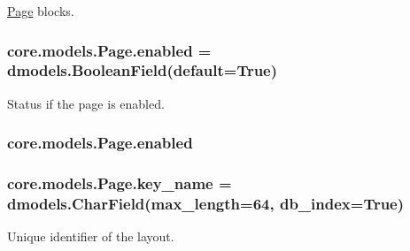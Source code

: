 \hyperlink{classcore_1_1models_1_1Page}{Page} blocks. 

\hypertarget{classcore_1_1models_1_1Page_acab3eb077ef1d77f01a48bff74c956df}{
\subsubsection[{enabled}]{\setlength{\rightskip}{0pt plus 5cm}core.\-models.\-Page.\-enabled = dmodels.\-Boolean\-Field(default=True)\hspace{0.3cm}{\ttfamily [static]}}}\label{classcore_1_1models_1_1Page_acab3eb077ef1d77f01a48bff74c956df}


Status if the page is enabled. 

\hypertarget{classcore_1_1models_1_1Page_acab3eb077ef1d77f01a48bff74c956df}{
\subsubsection[{enabled}]{\setlength{\rightskip}{0pt plus 5cm}core.\-models.\-Page.\-enabled}}\label{classcore_1_1models_1_1Page_acab3eb077ef1d77f01a48bff74c956df}
\hypertarget{classcore_1_1models_1_1Page_a25178e4dfd9fafc8e1e6dea92ed53471}{
\subsubsection[{key\-\_\-name}]{\setlength{\rightskip}{0pt plus 5cm}core.\-models.\-Page.\-key\-\_\-name = dmodels.\-Char\-Field(max\-\_\-length=64, db\-\_\-index=True)\hspace{0.3cm}{\ttfamily [static]}}}\label{classcore_1_1models_1_1Page_a25178e4dfd9fafc8e1e6dea92ed53471}


Unique identifier of the layout. 

